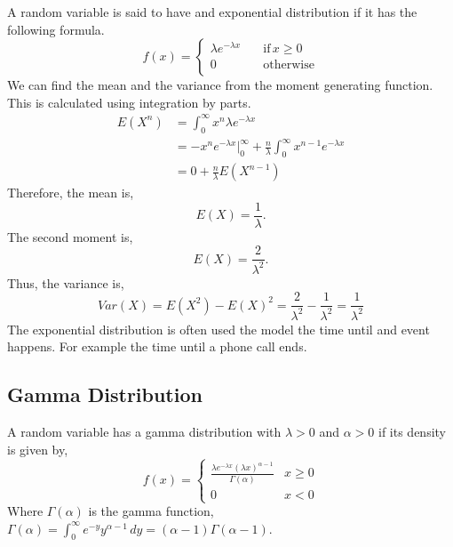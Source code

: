 \documentclass{article}
\begin{document}
A random variable is said to have and exponential distribution if it has the following formula.
$$
    f(x) = 
    \begin{cases}
        \lambda e ^ {-\lambda x} \quad & \text{if} \, x \geq 0 \\
        0 \quad & \text{otherwise} \\
    \end{cases}
$$
We can find the mean and the variance from the moment generating function. This is calculated using integration by parts.
\begin{align}
    E(X^n) & = \int_{0}^{\infty} x^n \lambda e^{-\lambda x} \\
           & = - x^n e^{-\lambda x} \Bigr|^\infty_0 + \frac{n}{\lambda}\int_{0}^{\infty} x^{n - 1} e^{-\lambda x} \\
           & = 0 + \frac{n}{\lambda} E(X^{n - 1})
\end{align}
Therefore, the mean is,
\begin{equation}
    E(X) = \frac{1}{\lambda}.
\end{equation}
The second moment is,
\begin{equation}
    E(X) = \frac{2}{\lambda^2}.
\end{equation}
Thus, the variance is,
\begin{equation}
    Var(X) = E(X^2) - E(X)^2 = \frac{2}{\lambda^2} - \frac{1}{\lambda^2} = \frac{1}{\lambda^2}
\end{equation}
The exponential distribution is often used the model the time until and event happens. For example the time until a phone call ends.

\subsection{Gamma Distribution}

A random variable has a gamma distribution with $\lambda > 0$ and $\alpha > 0$ if its density is given by,
\begin{equation}
    f(x) =
    \begin{cases}
        \frac{\lambda e^{-\lambda x} (\lambda x)^{\alpha - 1}}{\Gamma(\alpha)} & x \geq 0 \\
        0 & x < 0
    \end{cases}
\end{equation}
Where $\Gamma(\alpha)$ is the gamma function, $\Gamma(\alpha) = \int_0^\infty e^{-y} y^{\alpha - 1} \, dy = (\alpha - 1)\Gamma(\alpha - 1)$.


\end{document}
